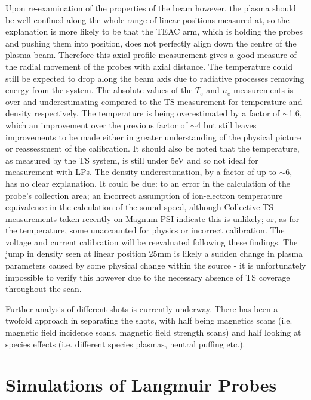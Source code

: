 \documentclass[a4paper, 12pt]{article} %
\begin{document}
	Upon re-examination of the properties of the beam however, the plasma should be well confined along the whole range of linear positions measured at, so the explanation is more likely to be that the TEAC arm, which is holding the probes and pushing them into position, does not perfectly align down the centre of the plasma beam. 
	Therefore this axial profile measurement gives a good measure of the radial movement of the probes with axial distance. 
	The temperature could still be expected to drop along the beam axis due to radiative processes removing energy from the system. 
	The absolute values of the $T_e$ and $n_e$ measurements is over and underestimating compared to the TS measurement for temperature and density respectively. 
	The temperature is being overestimated by a factor of $\sim$1.6, which an improvement over the previous factor of $\sim$4 but still leaves improvements to be made either in greater understanding of the physical picture or reassessment of the calibration. 
	It should also be noted that the temperature, as measured by the TS system, is still under 5eV and so not ideal for measurement with LPs.
	The density underestimation, by a factor of up to $\sim$6, has no clear explanation. 
	It could be due: to an error in the calculation of the probe's collection area; an incorrect assumption of ion-electron temperature equivalence in the calculation of the sound speed, although Collective TS measurements taken recently on Magnum-PSI indicate this is unlikely; or, as for the temperature, some unaccounted for physics or incorrect calibration.
	The voltage and current calibration will be reevaluated following these findings.
	The jump in density seen at linear position 25mm is likely a sudden change in plasma parameters caused by some physical change within the source - it is unfortunately impossible to verify this however due to the necessary absence of TS coverage throughout the scan. 
	
	Further analysis of different shots is currently underway. 
	There has been a twofold approach in separating the shots, with half being magnetics scans (i.e. magnetic field incidence scans, magnetic field strength scans) and half looking at species effects (i.e. different species plasmas, neutral puffing etc.).
	

\section{\label{sec:lpsims}Simulations of Langmuir Probes}
\end{document}
